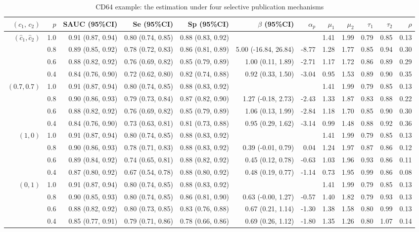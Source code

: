 \begin{table}

\caption{CD64 example: the estimation under four selective publication mechanisms}
\centering
\begin{tabular}[t]{rrrrrrrrrrrr}
\toprule
$(c_1, \,c_2)$ & $p$ & SAUC (95\%CI) & Se (95\%CI) & Sp (95\%CI) & $\beta$ (95\%CI) & $\alpha_p$ & $\mu_1$ & $\mu_2$ & $\tau_1$ & $\tau_2$ & $\rho$\\
\midrule
$(\hat{c}_1, \hat{c}_2)$ & 1.0 & 0.91 (0.87, 0.94) & 0.80 (0.74, 0.85) & 0.88 (0.83, 0.92) &  &  & 1.41 & 1.99 & 0.79 & 0.85 & 0.13\\
 & 0.8 & 0.89 (0.85, 0.92) & 0.78 (0.72, 0.83) & 0.86 (0.81, 0.89) & 5.00 (-16.84, 26.84) & -8.77 & 1.28 & 1.77 & 0.85 & 0.94 & 0.30\\
 & 0.6 & 0.88 (0.82, 0.92) & 0.76 (0.69, 0.82) & 0.85 (0.79, 0.89) & 1.00 (0.11, 1.89) & -2.71 & 1.17 & 1.72 & 0.86 & 0.89 & 0.29\\
 & 0.4 & 0.84 (0.76, 0.90) & 0.72 (0.62, 0.80) & 0.82 (0.74, 0.88) & 0.92 (0.33, 1.50) & -3.04 & 0.95 & 1.53 & 0.89 & 0.90 & 0.35\\
\addlinespace
$(0.7, 0.7)$ & 1.0 & 0.91 (0.87, 0.94) & 0.80 (0.74, 0.85) & 0.88 (0.83, 0.92) &  &  & 1.41 & 1.99 & 0.79 & 0.85 & 0.13\\
 & 0.8 & 0.90 (0.86, 0.93) & 0.79 (0.73, 0.84) & 0.87 (0.82, 0.90) & 1.27 (-0.18, 2.73) & -2.43 & 1.33 & 1.87 & 0.83 & 0.88 & 0.22\\
 & 0.6 & 0.88 (0.82, 0.92) & 0.76 (0.69, 0.82) & 0.85 (0.79, 0.89) & 1.06 (0.13, 1.99) & -2.84 & 1.18 & 1.70 & 0.85 & 0.90 & 0.30\\
 & 0.4 & 0.84 (0.76, 0.90) & 0.73 (0.63, 0.81) & 0.81 (0.73, 0.88) & 0.95 (0.29, 1.62) & -3.14 & 0.99 & 1.48 & 0.88 & 0.92 & 0.36\\
\addlinespace
$(1, 0)$ & 1.0 & 0.91 (0.87, 0.94) & 0.80 (0.74, 0.85) & 0.88 (0.83, 0.92) &  &  & 1.41 & 1.99 & 0.79 & 0.85 & 0.13\\
 & 0.8 & 0.90 (0.86, 0.93) & 0.78 (0.71, 0.83) & 0.88 (0.83, 0.92) & 0.39 (-0.01, 0.79) & 0.04 & 1.24 & 1.97 & 0.87 & 0.86 & 0.12\\
 & 0.6 & 0.89 (0.84, 0.92) & 0.74 (0.65, 0.81) & 0.88 (0.82, 0.92) & 0.45 (0.12, 0.78) & -0.63 & 1.03 & 1.96 & 0.93 & 0.86 & 0.11\\
 & 0.4 & 0.87 (0.80, 0.92) & 0.67 (0.54, 0.78) & 0.88 (0.80, 0.92) & 0.48 (0.19, 0.77) & -1.14 & 0.73 & 1.95 & 0.99 & 0.86 & 0.08\\
\addlinespace
$(0, 1)$ & 1.0 & 0.91 (0.87, 0.94) & 0.80 (0.74, 0.85) & 0.88 (0.83, 0.92) &  &  & 1.41 & 1.99 & 0.79 & 0.85 & 0.13\\
 & 0.8 & 0.90 (0.85, 0.93) & 0.80 (0.74, 0.85) & 0.86 (0.81, 0.90) & 0.63 (-0.00, 1.27) & -0.57 & 1.40 & 1.82 & 0.79 & 0.93 & 0.13\\
 & 0.6 & 0.88 (0.82, 0.92) & 0.80 (0.73, 0.85) & 0.83 (0.76, 0.88) & 0.67 (0.21, 1.14) & -1.30 & 1.38 & 1.58 & 0.80 & 0.99 & 0.13\\
 & 0.4 & 0.85 (0.77, 0.91) & 0.79 (0.71, 0.86) & 0.78 (0.66, 0.86) & 0.69 (0.26, 1.12) & -1.80 & 1.35 & 1.26 & 0.80 & 1.07 & 0.14\\
\bottomrule
\end{tabular}
\end{table}
